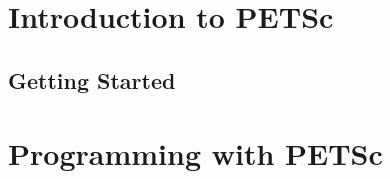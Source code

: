 \documentclass[twoside,11pt]{../sty/report_petsc}
\begin{document}
\cleardoublepage
\pagestyle{plain}

\vspace{1in}
\date{\today}



\cleardoublepage



\medskip \medskip

\cleardoublepage




\cleardoublepage

\tableofcontents

\cleardoublepage
\part{Introduction to PETSc}
\label{part_intro}
\cleardoublepage
\chapter{Getting Started}


\cleardoublepage
\part{Programming with PETSc}
\label{part_usage}





\cleardoublepage

\addtocounter{chapter}{1}
\label{sec:bib}

\end{document}
